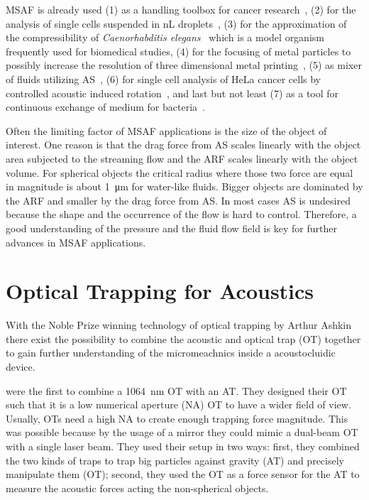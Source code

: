 MSAF is already used (1) as a handling toolbox for cancer 
research~\cite{Antfolk2015,Wu2021,Wang2020,Nguyen2021}, (2) for the analysis of 
single cells suspended in \si{\nano\liter} droplets~\cite{Gerlt2020a}, (3) for 
the approximation of the compressibility of \emph{Caenorhabditis 
elegans}~\cite{Baasch2018} which is a model organism frequently used for 
biomedical studies, (4) for the focusing of metal particles to possibly 
increase the resolution of three dimensional metal printing~\cite{Gerlt2022}, 
(5) as mixer of fluids utilizing 
AS~\cite{Patel2014,Ozcelik2014,Bachman2020,Zhang2021}, (6) for single cell 
analysis of HeLa cancer cells by controlled acoustic induced 
rotation~\cite{Laeubli2021}, and last but not least (7) as a tool for 
continuous exchange of medium for bacteria~\cite{Gerlt2021}.

Often the limiting factor of MSAF applications is the size of the object of 
interest. One reason is that the drag force from AS scales linearly with the 
object area subjected to the streaming flow and the ARF scales linearly with 
the object volume. For spherical objects the critical radius where those two 
force are equal in magnitude is about \SI{1}{\um} for water-like fluids. Bigger 
objects are dominated by the ARF and smaller by the drag force from AS. In most 
cases AS is undesired because the shape and the occurrence of the flow is hard 
to control. Therefore, a good understanding of the pressure and the fluid flow 
field is key for further advances in MSAF applications.

\section{Optical Trapping for Acoustics}

With the Noble Prize winning technology of optical trapping by Arthur 
Ashkin~\cite{Ashkin1978,Ashkin1987,Ashkin2002,Ashkin1986,Ashkin1992,Ashkin1997} 
there exist the possibility to combine the acoustic and optical trap (OT) 
together to gain further understanding of the micromeachnics inside a 
acoustocluidic device.

 were the first to combine a \SI{1064}{\nm} OT with an 
AT. They designed their OT such that it is a low numerical aperture (NA) OT to 
have a wider field of view. Usually, OTs need a high NA to create enough 
trapping force magnitude. This was possible because by the usage of a mirror 
they could mimic a dual-beam OT with a single laser beam. They used their setup 
in two ways: first, they combined the two kinds of traps to trap big particles 
against gravity (AT) and precisely manipulate them (OT); second, they used the 
OT as a force sensor for the AT to measure the acoustic forces acting the 
non-spherical objects.

